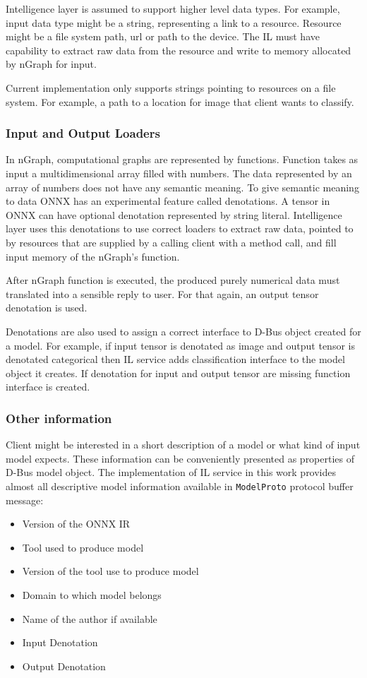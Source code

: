 \documentclass[english, 12pt, a4paper, elec, utf8, online]{aaltothesis}
\begin{document}
Intelligence layer is assumed to support higher level data types. For example, input data type might be a string, representing a link to a resource. Resource might be a file system path, url or path to the device. The IL must have capability to extract raw data from the resource and write to memory allocated by nGraph for input. 

Current implementation only supports strings pointing to resources on a file system. For example, a path to a location for image that client wants to classify.      

\subsubsection{Input and Output Loaders} 
In nGraph, computational graphs are represented by functions. Function takes as input a multidimensional array filled with numbers. The data represented by an array of numbers does not have any semantic meaning. To give semantic meaning to data ONNX has an experimental feature called denotations. A tensor in ONNX can have optional denotation represented by string literal. Intelligence layer uses this denotations to use correct loaders to extract raw data, pointed to by resources that are supplied by a calling client with a method call, and fill input memory of the nGraph's function. 

After nGraph function is executed, the produced purely numerical data must translated into a sensible reply to user. For that again, an output tensor denotation is used.        
  
Denotations are also used to assign a correct interface to D-Bus object created for a model. For example, if input tensor is denotated as image and output tensor is denotated categorical then IL service adds classification interface to the model object it creates. If denotation for input and output tensor are missing function interface is created.               
                  
\subsubsection{Other information}
Client might be interested in a short description of a model or what kind of input model expects. These information can be conveniently presented as properties of D-Bus model object. The implementation of IL service in this work provides almost all descriptive model information available in \texttt{ModelProto} protocol buffer message:
\begin{itemize}
\item
Version of the ONNX IR
\item
Tool used to produce model
\item
Version of the tool use to produce model
\item
Domain to which model belongs
\item
Name of the author if available
\item
Input Denotation
\item
Output Denotation
\end{itemize}
\end{document}
